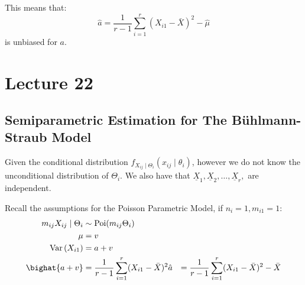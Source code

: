 \documentclass[english,12pt]{article}
\theoremstyle{plain}
\theoremstyle{definition}
\theoremstyle{definition} %
\newcommand{\var}[1]{\mbox{Var} \left( #1 \right)}
\begin{document}
This means that:
\[\hat{a}=\frac{1}{r-1}\sum_{i=1}^r(X_{i1}-\bar{X})^2-\hat{\mu}\]
is unbiased for $a$.


\section*{Lecture 22}
\subsection{Semiparametric Estimation for The B\"{u}hlmann-Straub Model}
Given the conditional distribution $f_{X_{ij}\mid\Theta_i}(x_{ij}\mid\theta_i)$, however we do not know the unconditional distribution of $\Theta_i$.  We also have that $\underline{X}_1,\underline{X}_2,\ldots, \underline{X}_r,$ are independent.

Recall the assumptions for the Poisson Parametric Model, if $n_i=1, m_{i1}=1$:
\begin{align*}
m_{ij}X_{ij}\mid\Theta_i&\sim\text{Poi}(m_{ij}\Theta_i)\\
\mu&=v\\
\var{X_{i1}}&=a+v\\
\bighat{a+v}&=\frac{1}{r-1}\sum_{i=1}^r(X_{i1}-\bar{X})^2
\hat{a}&=\frac{1}{r-1}\sum_{i=1}^r(X_{i1}-\bar{X})^2-\bar{X}
\end{align*}
\end{document}

